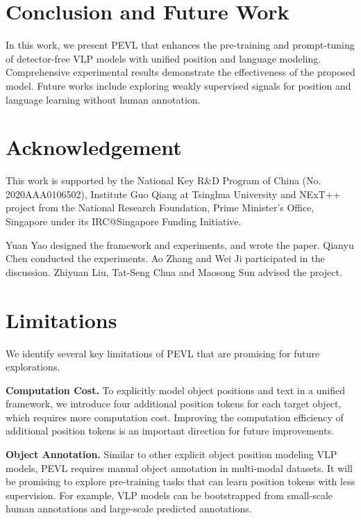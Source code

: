 \documentclass[11pt]{article}
\begin{document}
\section{Conclusion and Future Work}
In this work, we present PEVL that enhances the pre-training and prompt-tuning of detector-free VLP models with unified position and language modeling. Comprehensive experimental results demonstrate the effectiveness of the proposed model. Future works include exploring weakly supervised signals for position and language learning without human annotation.

\section{Acknowledgement}
This work is supported by the National Key R\&D Program of China (No. 2020AAA0106502), Institute Guo Qiang at Tsinghua University and NExT++ project from the National Research Foundation, Prime Minister’s Office, Singapore under its IRC@Singapore Funding Initiative.

Yuan Yao designed the framework and experiments, and wrote
the paper. Qianyu Chen conducted the
experiments. Ao Zhang and Wei Ji participated in the discussion. Zhiyuan Liu, Tat-Seng Chua and Maosong Sun advised the project.

\section{Limitations}
We identify several key limitations of PEVL that are promising for future explorations.

\smallskip
\noindent
\textbf{Computation Cost.} To explicitly model object positions and text in a unified framework, we introduce four additional position tokens for each target object, which requires more computation cost. Improving the computation efficiency of additional position tokens is an important direction for future improvements.

\smallskip
\noindent
\textbf{Object Annotation.} Similar to other explicit object position modeling VLP models, PEVL requires manual object annotation in multi-modal datasets. It will be promising to explore pre-training tasks that can learn position tokens with less supervision. For example, VLP models can be bootstrapped from small-scale human annotations and large-scale predicted annotations.




\appendix
\end{document}
